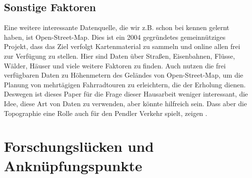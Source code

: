 \documentclass[a4paper,12pt]{thesis}
\begin{document}
\subsection{Sonstige Faktoren}

Eine weitere interessante Datenquelle, die wir z.B. schon bei \cite{Alattar2021} kennen gelernt haben, ist Open-Street-Map. Dies ist ein 2004 gegründetes gemeinnütziges Projekt, dass das Ziel verfolgt Kartenmaterial zu sammeln und online allen frei zur Verfügung zu stellen. Hier sind Daten über Straßen, Eisenbahnen, Flüsse, Wälder, Häuser und viele weitere Faktoren zu finden. Auch \cite{Carl2015} nutzen die frei verfügbaren Daten zu Höhenmetern des Geländes von Open-Street-Map, um die Planung von mehrtägigen Fahrradtouren zu erleichtern, die der Erholung dienen. Deswegen ist dieses Paper für die Frage dieser Hausarbeit weniger interessant, die Idee, diese Art von Daten zu verwenden, aber könnte hilfreich sein. Dass aber die Topographie eine Rolle auch für den Pendler Verkehr spielt, zeigen \cite{Rietveld2004}.

\section{Forschungslücken und Anknüpfungspunkte}
\end{document}
